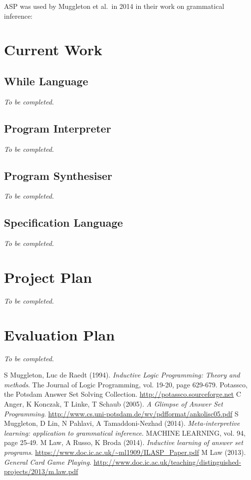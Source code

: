 \documentclass[a4paper,twoside,notitlepage]{article}
\begin{document}
ASP was used by Muggleton et al.\ in 2014\cite{metagol} in their work on grammatical 
inference: 

\section{Current Work}

\subsection{While Language} \label{sec:outlng}
\emph{To be completed.}

\subsection{Program Interpreter}
\emph{To be completed.}

\subsection{Program Synthesiser}
\emph{To be completed.}

\subsection{Specification Language} \label{sec:inplng}
\emph{To be completed.}

\section{Project Plan}
\emph{To be completed.}

\section{Evaluation Plan}
\emph{To be completed.}

\begin{thebibliography}{9}
        S Muggleton, Luc de Raedt (1994). \emph{Inductive Logic Programming: 
        Theory and methods}. The Journal of Logic Programming, vol. 19-20, page 
        629-679.
        Potassco, the Potsdam Answer Set Solving Collection. 
        \url{http://potassco.sourceforge.net}
        C Anger, K Konczak, T Linke, T Schaub (2005). \emph{A 
        Glimpse of Answer Set Programming}. 
        \url{http://www.cs.uni-potsdam.de/wv/pdfformat/ankolisc05.pdf}
        S Muggleton, D Lin, N Pahlavi, A Tamaddoni-Nezhad (2014). 
        \emph{Meta-interpretive learning: application to grammatical inference}.
        MACHINE LEARNING, vol. 94, page 25-49.
        M Law, A Russo, K Broda (2014). \emph{Inductive learning of answer set 
        programs}. \url{https://www.doc.ic.ac.uk/~ml1909/ILASP_Paper.pdf}
        M Law (2013). \emph{General Card Game Playing}.
        \url{http://www.doc.ic.ac.uk/teaching/distinguished-projects/2013/m.law.pdf}
\end{thebibliography}
\end{document}

